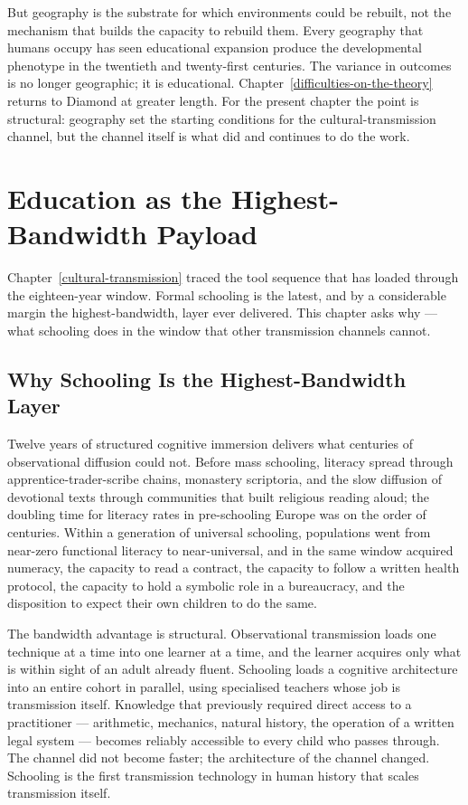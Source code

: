 \documentclass[12pt,letterpaper]{article}
\begin{document}
But geography is the substrate for which environments could be
rebuilt, not the mechanism that builds the capacity to rebuild them.
Every geography that humans occupy has seen educational expansion
produce the developmental phenotype in the twentieth and twenty-first
centuries. The variance in outcomes is no longer geographic; it is
educational. Chapter~\ref{difficulties-on-the-theory} returns to
Diamond at greater length. For the present chapter the point is
structural: geography set the starting conditions for the
cultural-transmission channel, but the channel itself is what did
and continues to do the work.

\section{Education as the Highest-Bandwidth Payload}\label{education-as-payload}

Chapter~\ref{cultural-transmission} traced the tool sequence that has
loaded through the eighteen-year window. Formal schooling is the
latest, and by a considerable margin the highest-bandwidth, layer
ever delivered. This chapter asks why --- what schooling does in the
window that other transmission channels cannot.

\subsection{Why Schooling Is the Highest-Bandwidth Layer}\label{why-schooling-is-the-highest-bandwidth-layer}

Twelve years of structured cognitive immersion delivers what centuries
of observational diffusion could not. Before mass schooling, literacy
spread through apprentice-trader-scribe chains, monastery scriptoria,
and the slow diffusion of devotional texts through communities that
built religious reading aloud; the doubling time for literacy rates
in pre-schooling Europe was on the order of centuries. Within a
generation of universal schooling, populations went from near-zero
functional literacy to near-universal, and in the same window acquired
numeracy, the capacity to read a contract, the capacity to follow a
written health protocol, the capacity to hold a symbolic role in a
bureaucracy, and the disposition to expect their own children to do
the same.

The bandwidth advantage is structural. Observational transmission
loads one technique at a time into one learner at a time, and the
learner acquires only what is within sight of an adult already
fluent. Schooling loads a cognitive architecture into an entire
cohort in parallel, using specialised teachers whose job is
transmission itself. Knowledge that previously required direct access
to a practitioner --- arithmetic, mechanics, natural history, the
operation of a written legal system --- becomes reliably accessible
to every child who passes through. The channel did not become faster;
the architecture of the channel changed. Schooling is the first
transmission technology in human history that scales transmission
itself.
\end{document}
